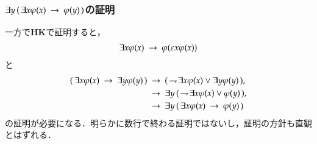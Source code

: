 \documentclass[dvipdfmx,10pt,notheorems]{beamer}
\theoremstyle{definition}
\newcommand{\negation}{\rightharpoondown\hspace{-0.25em}} %
\newcommand{\rarrow}{\hspace{0.25em}\rightarrow\hspace{0.25em}} %
\begin{document}
\begin{frame}\frametitle{$\exists y\, (\, \exists x \varphi(x) \rarrow \varphi(y)\, )$の証明}
	一方で{\bf HK}で証明すると，
	\begin{align}
		\exists x \varphi(x) \rarrow \varphi(\varepsilon x \varphi(x))
	\end{align}
	と
	\begin{align}
		(\, \exists x \varphi(x) \rarrow \exists y \varphi(y) \, )
		&\rarrow (\, \negation \exists x \varphi(x) \vee \exists y \varphi(y) \, ), \\
		&\rarrow \exists y\, (\, \negation \exists x \varphi(x) \vee \varphi(y) \, ), \\
		&\rarrow \exists y\, (\, \exists x \varphi(x) \rarrow \varphi(y) \, )
	\end{align}
	の証明が必要になる．明らかに数行で終わる証明ではないし，証明の方針も直観とはずれる．
\end{frame}
\end{document}
